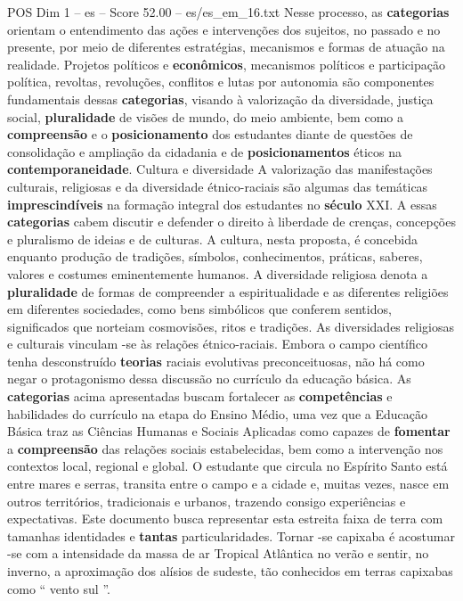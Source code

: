 \begin{textsample}{POS Dim 1 – es – Score 52.00 – es/es\_em\_16.txt}
Nesse processo, as \textbf{categorias} orientam o entendimento das ações e intervenções dos sujeitos, no passado e no presente, por meio de diferentes estratégias, mecanismos e formas de atuação na realidade.
Projetos políticos e \textbf{econômicos}, mecanismos políticos e participação política, revoltas, revoluções, conflitos e lutas por autonomia são componentes fundamentais dessas \textbf{categorias}, visando à valorização da diversidade, justiça social, \textbf{pluralidade} de visões de mundo, do meio ambiente, bem como a \textbf{compreensão} e o \textbf{posicionamento} dos estudantes diante de questões de consolidação e ampliação da cidadania e de \textbf{posicionamentos} éticos na \textbf{contemporaneidade}.
Cultura e diversidade A valorização das manifestações culturais, religiosas e da diversidade étnico-raciais são algumas das temáticas \textbf{imprescindíveis} na formação integral dos estudantes no \textbf{século} XXI.
A essas \textbf{categorias} cabem discutir e defender o direito à liberdade de crenças, concepções e pluralismo de ideias e de culturas.
A cultura, nesta proposta, é concebida enquanto produção de tradições, símbolos, conhecimentos, práticas, saberes, valores e costumes eminentemente humanos.
A diversidade religiosa denota a \textbf{pluralidade} de formas de compreender a espiritualidade e as diferentes religiões em diferentes sociedades, como bens simbólicos que conferem sentidos, significados que norteiam cosmovisões, ritos e tradições.
As diversidades religiosas e culturais vinculam -se às relações étnico-raciais.
Embora o campo científico tenha desconstruído \textbf{teorias} raciais evolutivas preconceituosas, não há como negar o protagonismo dessa discussão no currículo da educação básica.
As \textbf{categorias} acima apresentadas buscam fortalecer as \textbf{competências} e habilidades do currículo na etapa do Ensino Médio, uma vez que a Educação Básica traz as Ciências Humanas e Sociais Aplicadas como capazes de \textbf{fomentar} a \textbf{compreensão} das relações sociais estabelecidas, bem como a intervenção nos contextos local, regional e global.
O estudante que circula no Espírito Santo está entre mares e serras, transita entre o campo e a cidade e, muitas vezes, nasce em outros territórios, tradicionais e urbanos, trazendo consigo experiências e expectativas.
Este documento busca representar esta estreita faixa de terra com tamanhas identidades e \textbf{tantas} particularidades.
Tornar -se capixaba é acostumar -se com a intensidade da massa de ar Tropical Atlântica no verão e sentir, no inverno, a aproximação dos alísios de sudeste, tão conhecidos em terras capixabas como “ vento sul ”.

\end{textsample}
